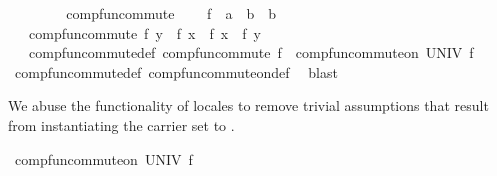 \begin{isabellebody}
\ \ \ \ \isamarkupfalse%
\isanewline
\ \ \isamarkupfalse%
\isanewline
{}\isamarkupfalse%
%
\endisatagproof
{\isafoldproof}%
%
\isadelimproof
%
\endisadelimproof
%
\isadelimdocument
%
\endisadelimdocument
%
\isatagdocument
%
\isamarkuptrue%
%
\endisatagdocument
{\isafolddocument}%
%
\isadelimdocument
%
\endisadelimdocument
{}\isamarkupfalse%
\ comp{\isacharunderscore}{\kern0pt}fun{\isacharunderscore}{\kern0pt}commute\ {\isacharequal}{\kern0pt}\isanewline
\ \ \ f\ {\isacharcolon}{\kern0pt}{\isacharcolon}{\kern0pt}\ {\isachardoublequoteopen}{\isacharprime}{\kern0pt}a\ {\isasymRightarrow}\ {\isacharprime}{\kern0pt}b\ {\isasymRightarrow}\ {\isacharprime}{\kern0pt}b{\isachardoublequoteclose}\isanewline
\ \ \ comp{\isacharunderscore}{\kern0pt}fun{\isacharunderscore}{\kern0pt}commute{\isacharcolon}{\kern0pt}\ {\isachardoublequoteopen}f\ y\ {\isasymcirc}\ f\ x\ {\isacharequal}{\kern0pt}\ f\ x\ {\isasymcirc}\ f\ y{\isachardoublequoteclose}\isanewline
{}\isanewline
\isanewline
{}\isamarkupfalse%
\ {\isacharparenleft}{\kern0pt}\ {\isacharminus}{\kern0pt}{\isacharparenright}{\kern0pt}\ comp{\isacharunderscore}{\kern0pt}fun{\isacharunderscore}{\kern0pt}commute{\isacharunderscore}{\kern0pt}def{\isacharprime}{\kern0pt}{\isacharcolon}{\kern0pt}\ {\isachardoublequoteopen}comp{\isacharunderscore}{\kern0pt}fun{\isacharunderscore}{\kern0pt}commute\ f\ {\isacharequal}{\kern0pt}\ comp{\isacharunderscore}{\kern0pt}fun{\isacharunderscore}{\kern0pt}commute{\isacharunderscore}{\kern0pt}on\ UNIV\ f{\isachardoublequoteclose}\isanewline
%
\isadelimproof
\ \ %
\endisadelimproof
%
\isatagproof
{}\isamarkupfalse%
\ comp{\isacharunderscore}{\kern0pt}fun{\isacharunderscore}{\kern0pt}commute{\isacharunderscore}{\kern0pt}def\ comp{\isacharunderscore}{\kern0pt}fun{\isacharunderscore}{\kern0pt}commute{\isacharunderscore}{\kern0pt}on{\isacharunderscore}{\kern0pt}def\ \isamarkupfalse%
\ blast%
\endisatagproof
{\isafoldproof}%
%
\isadelimproof
%
\endisadelimproof
%
\begin{isamarkuptext}%
We abuse the  functionality of locales to remove trivial assumptions that
  result from instantiating the carrier set to .%
\end{isamarkuptext}\isamarkuptrue%
\isamarkupfalse%
\ comp{\isacharunderscore}{\kern0pt}fun{\isacharunderscore}{\kern0pt}commute{\isacharunderscore}{\kern0pt}on\ UNIV\ f\isanewline

\end{isabellebody}
